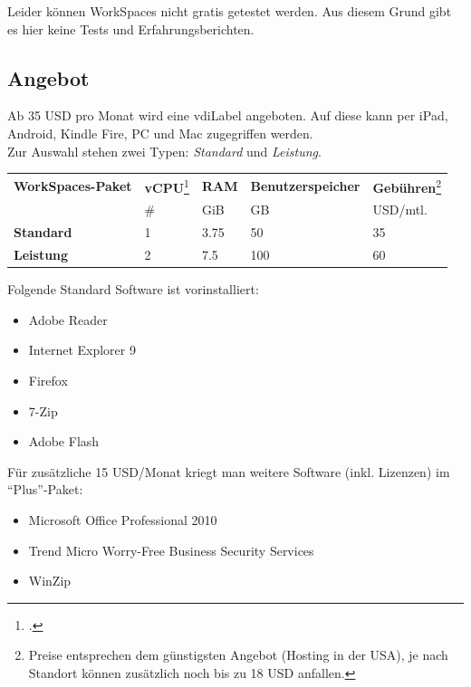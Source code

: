 Leider können WorkSpaces nicht gratis getestet werden. Aus diesem Grund gibt es hier keine Tests und Erfahrungsberichten.

\subsection{Angebot}
Ab 35 USD pro Monat wird eine \Gls{vdiLabel} angeboten. Auf diese kann per iPad, Android, Kindle Fire, PC und Mac zugegriffen werden.\\
Zur Auswahl stehen zwei Typen: \textit{Standard} und \textit{Leistung}.

\begin{table}[H]
	\centering
	\small\renewcommand{\arraystretch}{1.4}
	\begin{tabularx}{0.9\textwidth}{X | Y | Y | Y | Y }
		\hline
		\textbf{WorkSpaces-Paket} & \textbf{vCPU}\footcite{Virtual_CPUs_with_Amazon_Web_Services_2014-11-15} & \textbf{RAM} & \textbf{Benutzerspeicher} & \textbf{Gebühren}\footnote{Preise entsprechen dem günstigsten Angebot (Hosting in der USA), je nach Standort können zusätzlich noch bis zu 18 USD anfallen.}\\
		 & \# & GiB & GB & USD/mtl.\\
		\hline
			\textbf{Standard} & 1 & 3.75 & 50 & 35\\
			\textbf{Leistung} & 2 & 7.5 & 100 & 60\\
		\hline
	\end{tabularx}
\end{table}

Folgende Standard Software ist vorinstalliert:
\begin{itemize}
	\item Adobe Reader
	\item Internet Explorer 9
	\item Firefox
	\item 7-Zip
	\item Adobe Flash
\end{itemize}

Für zusätzliche 15 USD/Monat kriegt man weitere Software (inkl. Lizenzen) im "`Plus"'-Paket:
\begin{itemize}
	\item Microsoft Office Professional 2010
	\item Trend Micro Worry-Free Business Security Services
	\item WinZip
\end{itemize}

